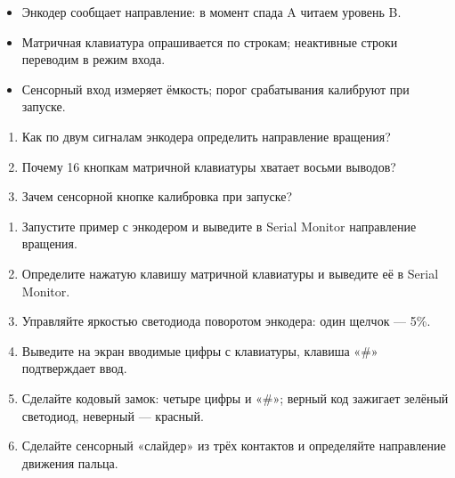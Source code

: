 \begin{summary}
\begin{itemize}[leftmargin=*]
  \item Энкодер сообщает направление: в момент спада A читаем уровень B.
  \item Матричная клавиатура опрашивается по строкам; неактивные строки переводим в режим входа.
  \item Сенсорный вход измеряет ёмкость; порог срабатывания калибруют при запуске.
\end{itemize}
\end{summary}

\begin{selfcheck}
\begin{enumerate}
  \item Как по двум сигналам энкодера определить направление вращения?
  \item Почему 16 кнопкам матричной клавиатуры хватает восьми выводов?
  \item Зачем сенсорной кнопке калибровка при запуске?
\end{enumerate}
\end{selfcheck}

\begin{tasks}
\begin{enumerate}
\item {} Запустите пример с энкодером и выведите в Serial Monitor направление вращения.
\item {} Определите нажатую клавишу матричной клавиатуры и выведите её в Serial Monitor.
\item {} Управляйте яркостью светодиода поворотом энкодера: один щелчок --- 5\%.
\item {} Выведите на экран вводимые цифры с клавиатуры, клавиша «\#» подтверждает ввод.
\item {} Сделайте кодовый замок: четыре цифры и «\#»; верный код зажигает зелёный светодиод, неверный --- красный.
\item {} Сделайте сенсорный «слайдер» из трёх контактов и определяйте направление движения пальца.
\end{enumerate}
\end{tasks}
